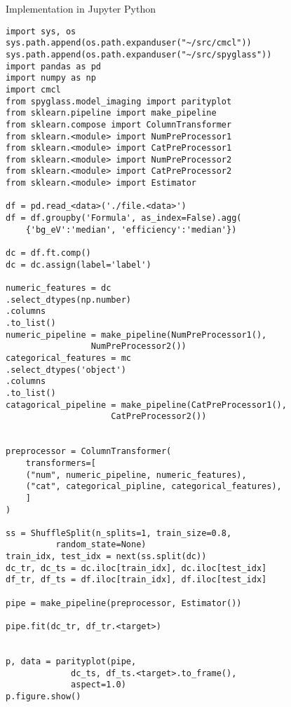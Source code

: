 \documentclass[10pt, compress]{beamer}
\begin{document}
\begin{frame}{Implementation in Jupyter Python}
 \small
\lstset{language=Python,label= ,caption= ,captionpos=b,numbers=none}
\begin{lstlisting}
import sys, os
sys.path.append(os.path.expanduser("~/src/cmcl"))
sys.path.append(os.path.expanduser("~/src/spyglass"))
import pandas as pd
import numpy as np
import cmcl
from spyglass.model_imaging import parityplot
from sklearn.pipeline import make_pipeline
from sklearn.compose import ColumnTransformer
from sklearn.<module> import NumPreProcessor1
from sklearn.<module> import CatPreProcessor1
from sklearn.<module> import NumPreProcessor2
from sklearn.<module> import CatPreProcessor2
from sklearn.<module> import Estimator

df = pd.read_<data>('./file.<data>')
df = df.groupby('Formula', as_index=False).agg(
    {'bg_eV':'median', 'efficiency':'median'})

dc = df.ft.comp()
dc = dc.assign(label='label')

numeric_features = dc
.select_dtypes(np.number)
.columns
.to_list()
numeric_pipeline = make_pipeline(NumPreProcessor1(),
				 NumPreProcessor2())
categorical_features = mc
.select_dtypes('object')
.columns
.to_list()
catagorical_pipeline = make_pipeline(CatPreProcessor1(),
				     CatPreProcessor2())


preprocessor = ColumnTransformer(
    transformers=[
	("num", numeric_pipeline, numeric_features),
	("cat", categorical_pipline, categorical_features),
    ]
)

ss = ShuffleSplit(n_splits=1, train_size=0.8,
		  random_state=None)
train_idx, test_idx = next(ss.split(dc))
dc_tr, dc_ts = dc.iloc[train_idx], dc.iloc[test_idx]
df_tr, df_ts = df.iloc[train_idx], df.iloc[test_idx]

pipe = make_pipeline(preprocessor, Estimator())

pipe.fit(dc_tr, df_tr.<target>)


p, data = parityplot(pipe,
		     dc_ts, df_ts.<target>.to_frame(),
		     aspect=1.0)
p.figure.show()
\end{lstlisting}
\end{frame}
\end{document}

